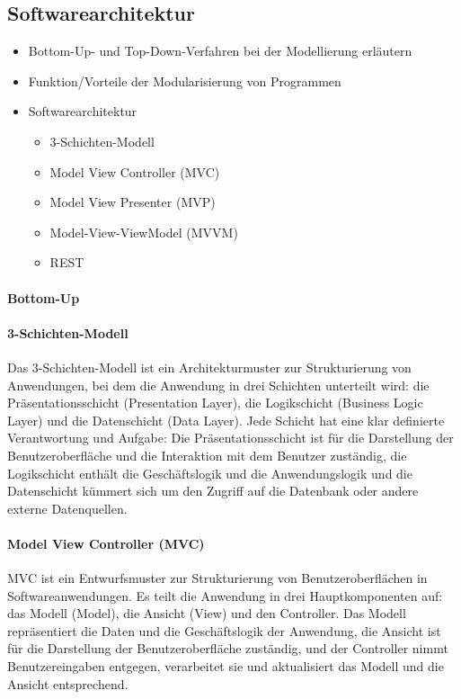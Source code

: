 \subsection{Softwarearchitektur}
\label{sec:Softwarearchitektur}

\begin{itemize}
	\item Bottom-Up- und Top-Down-Verfahren bei der Modellierung erläutern
	\item Funktion/Vorteile der Modularisierung von Programmen
	\item Softwarearchitektur
	\begin{itemize}
		\item 3-Schichten-Modell
		\item Model View Controller (MVC)
		\item Model View Presenter (MVP)
		\item Model-View-ViewModel (MVVM)
		\item REST
	\end{itemize}
\end{itemize}

\paragraph{Bottom-Up}

\paragraph{3-Schichten-Modell}

Das 3-Schichten-Modell ist ein Architekturmuster zur Strukturierung von Anwendungen, bei dem die Anwendung in drei Schichten unterteilt wird: die Präsentationsschicht (Presentation Layer), die Logikschicht (Business Logic Layer) und die Datenschicht (Data Layer). Jede Schicht hat eine klar definierte Verantwortung und Aufgabe: Die Präsentationsschicht ist für die Darstellung der Benutzeroberfläche und die Interaktion mit dem Benutzer zuständig, die Logikschicht enthält die Geschäftslogik und die Anwendungslogik und die Datenschicht kümmert sich um den Zugriff auf die Datenbank oder andere externe Datenquellen.

\paragraph{Model View Controller (MVC)}

MVC ist ein Entwurfsmuster zur Strukturierung von Benutzeroberflächen in Softwareanwendungen. Es teilt die Anwendung in drei Hauptkomponenten auf: das Modell (Model), die Ansicht (View) und den Controller. Das Modell repräsentiert die Daten und die Geschäftslogik der Anwendung, die Ansicht ist für die Darstellung der Benutzeroberfläche zuständig, und der Controller nimmt Benutzereingaben entgegen, verarbeitet sie und aktualisiert das Modell und die Ansicht entsprechend.

